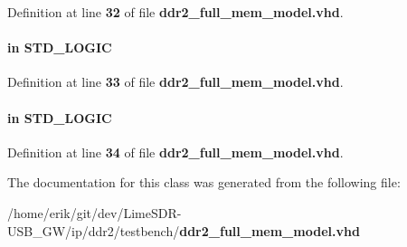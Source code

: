 Definition at line {\bf 32} of file {\bf ddr2\+\_\+full\+\_\+mem\+\_\+model.\+vhd}.

\paragraph[{wrclock}]{ {\bfseries \textcolor{keywordflow}{in}\textcolor{vhdlchar}{ }} {\bfseries \textcolor{comment}{S\+T\+D\+\_\+\+L\+O\+G\+IC}\textcolor{vhdlchar}{ }} \hspace{0.3cm}{\ttfamily [Port]}}\label{classddr2__full__mem__model__ram__module_a00d572e9785c73a69a3015b528e5e2e8}


Definition at line {\bf 33} of file {\bf ddr2\+\_\+full\+\_\+mem\+\_\+model.\+vhd}.

\paragraph[{wren}]{ {\bfseries \textcolor{keywordflow}{in}\textcolor{vhdlchar}{ }} {\bfseries \textcolor{comment}{S\+T\+D\+\_\+\+L\+O\+G\+IC}\textcolor{vhdlchar}{ }} \hspace{0.3cm}{\ttfamily [Port]}}\label{classddr2__full__mem__model__ram__module_aa4749dca6867b737ec6c2ce8ef202543}


Definition at line {\bf 34} of file {\bf ddr2\+\_\+full\+\_\+mem\+\_\+model.\+vhd}.



The documentation for this class was generated from the following file\+:\begin{DoxyCompactItemize}
\item 
/home/erik/git/dev/\+Lime\+S\+D\+R-\/\+U\+S\+B\+\_\+\+G\+W/ip/ddr2/testbench/{\bf ddr2\+\_\+full\+\_\+mem\+\_\+model.\+vhd}\end{DoxyCompactItemize}
